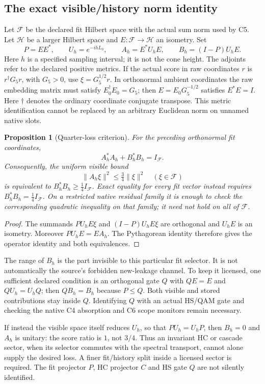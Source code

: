 \documentclass[11pt,a4paper]{article}
\newtheorem{proposition}{Proposition}
\begin{document}
\subsection{The exact visible/history norm identity}
Let $\mathcal F$ be the declared fit Hilbert space with the actual
sum norm used by C5. Let $\mathcal H$ be a larger Hilbert space and
$E:\mathcal F\to\mathcal H$ an isometry. Set
\[
 P=EE^*,\qquad U_h=e^{-ihL_0},\qquad
 A_h=E^*U_hE,\qquad B_h=(I-P)U_hE.
\]
Here $h$ is a specified sampling interval; it is not the cone height.
The adjoints refer to the declared positive metrics. If the actual
score in raw coordinates $r$ is $r^\dagger G_5r$, with $G_5>0$,
use $\xi=G_5^{1/2}r$. In orthonormal ambient coordinates the raw
embedding matrix must satisfy $E_0^\dagger E_0=G_5$; then
$E=E_0G_5^{-1/2}$ satisfies $E^*E=I$. Here $\dagger$ denotes the
ordinary coordinate conjugate transpose. This metric identification
cannot be replaced by an arbitrary Euclidean norm on unnamed native slots.

\begin{proposition}[Quarter-loss criterion]
\label{prop:riemann-quarter-loss-criterion}
For the preceding orthonormal fit coordinates,
\[
 A_h^*A_h+B_h^*B_h=I_{\mathcal F}.
\]
Consequently, the uniform visible bound
\[
 \|A_h\xi\|^2\le\tfrac34\|\xi\|^2
 \quad(\xi\in\mathcal F)
\]
is equivalent to $B_h^*B_h\ge\tfrac14I_{\mathcal F}$.
Exact equality for every fit vector instead requires
$B_h^*B_h=\tfrac14I_{\mathcal F}$. On a restricted native residual
family it is enough to check the corresponding quadratic inequality
on that family; it need not hold on all of $\mathcal F$.
\end{proposition}
\begin{proof}
The summands $PU_hE\xi$ and $(I-P)U_hE\xi$ are orthogonal and
$U_hE$ is an isometry. Moreover $PU_hE=EA_h$. The Pythagorean
identity therefore gives the operator identity and both equivalences.
\end{proof}

The range of $B_h$ is the part invisible to this particular fit
selector. It is not automatically the source's forbidden new-leakage
channel. To keep it licensed, one sufficient declared condition is an
orthogonal gate $Q$ with $QE=E$ and $QU_h=U_hQ$; then
$QB_h=B_h$ because $P\le Q$. Both visible and stored contributions
stay inside $Q$. Identifying $Q$ with an actual HS/QAM gate and
checking the native C4 absorption and C6 scope monitors remain necessary.

If instead the visible space itself reduces $U_h$, so that
$PU_h=U_hP$, then $B_h=0$ and $A_h$ is unitary: the score ratio is
$1$, not $3/4$. Thus an invariant HC or cascade sector, when its
selector commutes with the spectral transport, cannot alone supply
the desired loss. A finer fit/history split inside a licensed sector
is required. The fit projector $P$, HC projector $C$ and HS gate $Q$
are not silently identified.
\end{document}
